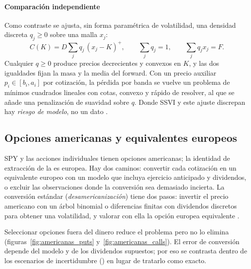 
\paragraph{Comparación independiente} Como contraste se ajusta, sin forma paramétrica de volatilidad, una
densidad discreta $q_j\ge 0$ sobre una malla $x_j$:
\begin{equation}
C(K)=D\sum_j q_j\,(x_j-K)^+,\qquad \sum_j q_j=1,\qquad \sum_j q_j x_j=F.
\label{eq:convexo}
\end{equation}
Cualquier $q\ge0$ produce precios decrecientes y convexos en $K$, y las dos igualdades fijan la masa y la
media del forward. Con un precio auxiliar $p_i\in[b_i,a_i]$ por cotización, la pérdida por banda se vuelve
un problema de mínimos cuadrados lineales con cotas, convexo y rápido de resolver, al que se añade una
penalización de suavidad sobre $q$. Donde SSVI y este ajuste discrepan hay \emph{riesgo de modelo}, no un
dato \citep{aitsahalia1998}.

\subsection{Opciones americanas y equivalentes europeos}\label{sec:americanas}

SPY y las acciones individuales tienen opciones americanas; la identidad de extracción de la
 es europea. Hay dos caminos: convertir cada cotización en un equivalente europeo con un
modelo que incluya ejercicio anticipado y dividendos, o excluir las observaciones donde la conversión sea
demasiado incierta. La conversión estándar (\emph{desamericanización}) tiene dos pasos: invertir el precio
americano con un árbol binomial \citep{cox1979} o diferencias finitas con dividendos discretos para obtener
una volatilidad, y valorar con ella la opción europea equivalente \citep{burkovska2018}.

Seleccionar opciones fuera del dinero reduce el problema pero no lo elimina
(figuras~\ref{fig:americanas_puts} y~\ref{fig:americanas_calls}). El error de conversión depende del
modelo y de los dividendos supuestos; por eso se contrasta dentro de los escenarios de incertidumbre
() en lugar de tratarlo como exacto.

